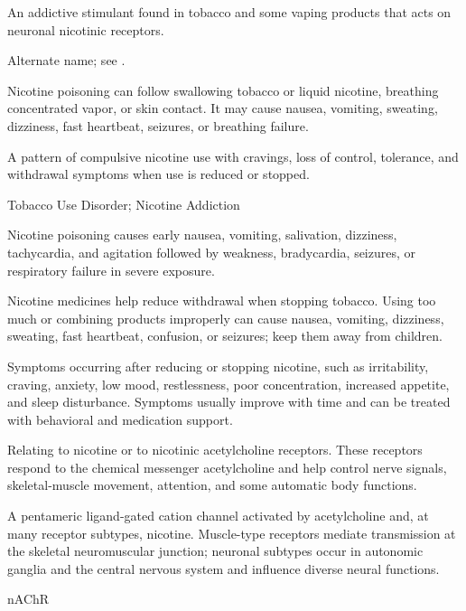  An addictive stimulant found in tobacco and some vaping products that acts on neuronal nicotinic receptors.

 Alternate name; see .

 Nicotine poisoning can follow swallowing tobacco or liquid nicotine, breathing concentrated vapor, or skin contact. It may cause nausea, vomiting, sweating, dizziness, fast heartbeat, seizures, or breathing failure.

 A pattern of compulsive nicotine use with cravings, loss of control, tolerance, and withdrawal symptoms when use is reduced or stopped.

\synonyms
Tobacco Use Disorder; Nicotine Addiction

 Nicotine poisoning causes early nausea, vomiting, salivation, dizziness, tachycardia, and agitation followed by weakness, bradycardia, seizures, or respiratory failure in severe exposure.

 Nicotine medicines help reduce withdrawal when stopping tobacco. Using too much or combining products improperly can cause nausea, vomiting, dizziness, sweating, fast heartbeat, confusion, or seizures; keep them away from children.

 Symptoms occurring after reducing or stopping nicotine, such as irritability, craving, anxiety, low mood, restlessness, poor concentration, increased appetite, and sleep disturbance. Symptoms usually improve with time and can be treated with behavioral and medication support.

 Relating to nicotine or to nicotinic acetylcholine receptors. These receptors respond to the chemical messenger acetylcholine and help control nerve signals, skeletal-muscle movement, attention, and some automatic body functions.

 A pentameric ligand-gated cation channel activated by acetylcholine and, at many receptor subtypes, nicotine. Muscle-type receptors mediate transmission at the skeletal neuromuscular junction; neuronal subtypes occur in autonomic ganglia and the central nervous system and influence diverse neural functions.

\synonyms
nAChR

